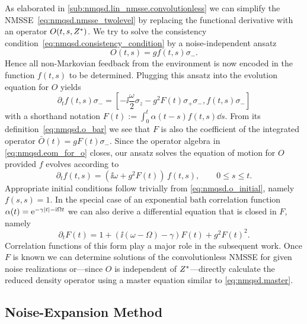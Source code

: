 As elaborated in \autoref{sub:nmqsd.lin_nmsse.convolutionless} we can simplify the NMSSE~\ref{eq:nmqsd.nmsse_twolevel} by replacing the functional derivative with an operator $O(t, s, {Z}^*)$.
We try to solve the consistency condition~\ref{eq:nmqsd.consistency_condition} by a noise-independent ansatz
\begin{equation}
  O(t, s) = g f(t, s) \sigma_-.
  \label{eq:nmqsd.o_ansatz}
\end{equation}
Hence all non-Markovian feedback from the environment is now encoded in the function $f(t, s)$ to be determined.
Plugging this ansatz into the evolution equation for $O$ yields
\begin{equation}
  \partial_t f(t, s) \sigma_- = \left[-\ii \frac{\omega}{2} \sigma_z - g^2 F(t) \sigma_+\sigma_-, f(t, s) \sigma_-\right]
  \label{eq:nmqsd.eom_for_o}
\end{equation}
with a shorthand notation $F(t) := \int_0^t \alpha(t-s) f(t, s) \dd s$.
From its definition~\ref{eq:nmqsd.o_bar} we see that $F$ is also the coefficient of the integrated operator $\bar O(t) = g F(t) \sigma_-$.
Since the operator algebra in \autoref{eq:nmqsd.eom_for_o} closes, our ansatz solves the equation of motion for $O$ provided $f$ evolves according to
\begin{equation*}
  \partial_t f(t, s) = \left(\ii \omega + g^2 F(t)\right) \, f(t, s), \qquad 0 \le s \le t.
\end{equation*}
Appropriate initial conditions follow trivially from \autoref{eq:nmqsd.o_initial}, namely $f(s, s) = 1$.
In the special case of an exponential bath correlation function $\alpha(t) = \exp[-\gamma\abs{t} - \ii\Omega t]$ we can also derive a differential equation that is closed in $F$, namely
\begin{equation}
  \partial_t F(t) = 1 + (\ii (\omega - \Omega) - \gamma) F(t) + g^2 F(t)^2.
  \label{eq:nmqsd.twolevel_f}
\end{equation}
Correlation functions of this form play a major role in the subsequent work.
Once $F$ is known we can determine solutions of the convolutionless NMSSE for given noise realizations or---since $O$ is independent of ${Z}^*$---directly calculate the reduced density operator using a master equation similar to \autoref{eq:nmqsd.master}.

\subsection{Noise-Expansion Method}
\label{sub:nmqsd.expansion}

